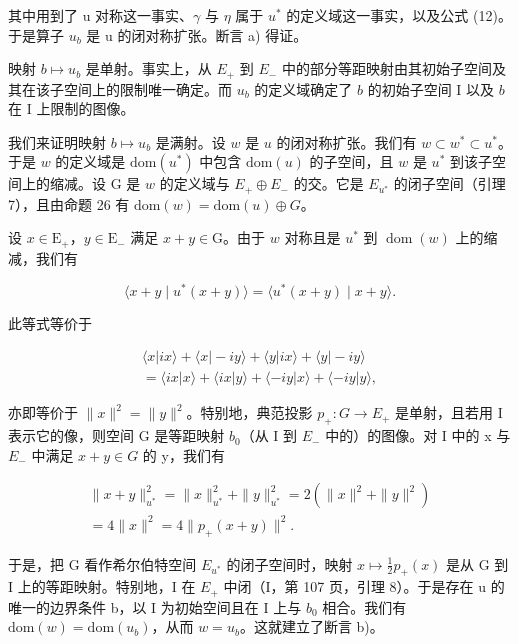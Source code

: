 其中用到了 u 对称这一事实、\(\gamma\) 与 \(\eta\) 属于 \(u^{*}\) 的定义域这一事实，以及公式 (12)。于是算子 \(u_{b}\) 是 u 的闭对称扩张。断言 a) 得证。

映射 \(b \mapsto u_b\) 是单射。事实上，从 \(E_+\) 到 \(E_-\) 中的部分等距映射由其初始子空间及其在该子空间上的限制唯一确定。而 \(u_b\) 的定义域确定了 \(b\) 的初始子空间 I 以及 \(b\) 在 I 上限制的图像。

我们来证明映射 \(b \mapsto u_b\) 是满射。设 \(w\) 是 \(u\) 的闭对称扩张。我们有 \(w \subset w^* \subset u^*\)。于是 \(w\) 的定义域是 \(\text{dom}(u^*)\) 中包含 \(\text{dom}(u)\) 的子空间，且 \(w\) 是 \(u^*\) 到该子空间上的缩减。设 G 是 \(w\) 的定义域与 \(E_+ \oplus E_-\) 的交。它是 \(E_{u^*}\) 的闭子空间（引理 7），且由命题 26 有 \(\text{dom}(w) = \text{dom}(u) \oplus G\)。

设 \(x \in \mathrm{E}_{+}\)，\(y \in \mathrm{E}_{-}\) 满足 \(x + y \in \mathrm{G}\)。由于 \(w\) 对称且是 \(u^{*}\) 到 \(\operatorname{dom}(w)\) 上的缩减，我们有

\[
\langle x + y \mid u ^ {*} (x + y) \rangle = \langle u ^ {*} (x + y) \mid x + y \rangle .
\]

此等式等价于

\[
\begin{array}{c} \langle x | i x \rangle + \langle x | - i y \rangle + \langle y | i x \rangle + \langle y | - i y \rangle \\ = \langle i x | x \rangle + \langle i x | y \rangle + \langle - i y | x \rangle + \langle - i y | y \rangle , \end{array}
\]

亦即等价于 \(\|x\|^{2} = \|y\|^{2}\)。特别地，典范投影 \(p_{+}: G \to E_{+}\) 是单射，且若用 I 表示它的像，则空间 G 是等距映射 \(b_{0}\)（从 I 到 \(E_{-}\) 中的）的图像。对 I 中的 x 与 \(E_{-}\) 中满足 \(x + y \in G\) 的 y，我们有

\[
\begin{array}{r} \| x + y \| _ {u ^ {*}} ^ {2} = \| x \| _ {u ^ {*}} ^ {2} + \| y \| _ {u ^ {*}} ^ {2} = 2 (\| x \| ^ {2} + \| y \| ^ {2}) \\ = 4 \| x \| ^ {2} = 4 \| p _ {+} (x + y) \| ^ {2}. \end{array}
\]

于是，把 G 看作希尔伯特空间 \(E_{u^{*}}\) 的闭子空间时，映射 \(x \mapsto \frac{1}{2}p_{+}(x)\) 是从 G 到 I 上的等距映射。特别地，I 在 \(E_{+}\) 中闭（I，第 107 页，引理 8）。于是存在 u 的唯一的边界条件 b，以 I 为初始空间且在 I 上与 \(b_{0}\) 相合。我们有 \(\text{dom}(w) = \text{dom}(u_{b})\)，从而 \(w = u_{b}\)。这就建立了断言 b)。

